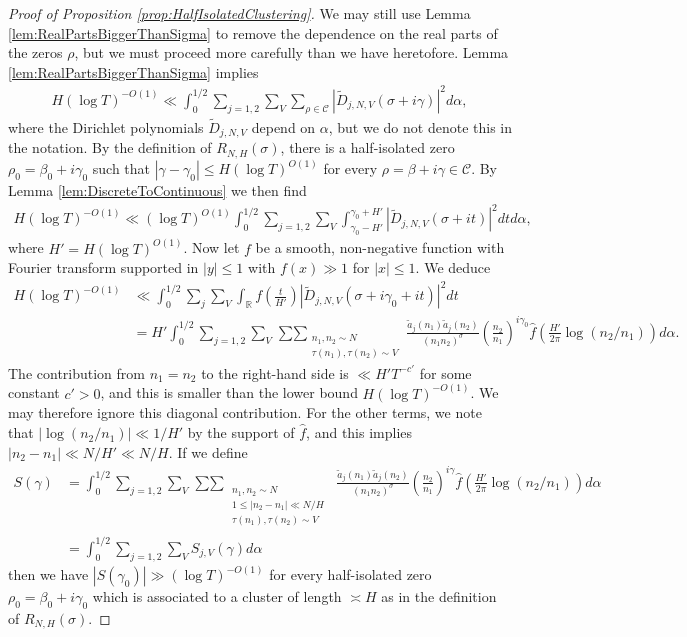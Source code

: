 \documentclass[12pt]{amsart}
\theoremstyle{plain}
\theoremstyle{definition}
\theoremstyle{remark}
\begin{document}
\begin{proof}[Proof of Proposition \ref{prop:HalfIsolatedClustering}]
We may still use Lemma \ref{lem:RealPartsBiggerThanSigma} to remove the dependence on the real parts of the zeros $\rho$, but we must proceed more carefully than we have heretofore. Lemma \ref{lem:RealPartsBiggerThanSigma} implies
\begin{align*}
H(\log T)^{-O(1)} \ll \int_0^{1/2}\sum_{j=1,2}\sum_V\sum_{\rho \in \mathcal{C}} |\tilde{D}_{j,N,V}(\sigma+i\gamma)|^2 d\alpha,
\end{align*}
where the Dirichlet polynomials $\tilde{D}_{j,N,V}$ depend on $\alpha$, but we do not denote this in the notation. By the definition of $R_{N,H}(\sigma)$, there is a half-isolated zero $\rho_0 = \beta_0 + i\gamma_0$ such that $|\gamma-\gamma_0| \leq H(\log T)^{O(1)}$ for every $\rho = \beta+i\gamma \in \mathcal{C}$. By Lemma \ref{lem:DiscreteToContinuous} we then find
\begin{align*}
H(\log T)^{-O(1)} \ll (\log T)^{O(1)}\int_0^{1/2}\sum_{j=1,2}\sum_V \int_{\gamma_0-H'}^{\gamma_0+H'} |\tilde{D}_{j,N,V}(\sigma+it)|^2 dt d\alpha,
\end{align*}
where $H' = H(\log T)^{O(1)}$. Now let $f$ be a smooth, non-negative function with Fourier transform supported in $|y| \leq 1$ with $f(x) \gg 1$ for $|x| \leq 1$. We deduce
\begin{align*}
H(\log T)^{-O(1)} &\ll\int_0^{1/2}\sum_j\sum_V \int_\mathbb{R} f\left(\frac{t}{H'}\right)|\tilde{D}_{j,N,V}(\sigma+i\gamma_0 + it)|^2 dt \\
&= H'\int_0^{1/2}\sum_{j=1,2}\sum_V\mathop{\sum\sum}_{\substack{n_1,n_2 \sim N \\ \tau(n_1),\tau(n_2) \sim V}} \frac{\tilde{a}_j(n_1)\tilde{a}_j(n_2)}{(n_1n_2)^\sigma}\left(\frac{n_2}{n_1}\right)^{i\gamma_0} \widehat{f}\left(\frac{H'}{2\pi}\log(n_2/n_1)\right)d\alpha.
\end{align*}
The contribution from $n_1=n_2$ to the right-hand side is $\ll H' T^{-c'}$ for some constant $c'>0$, and this is smaller than the lower bound $H(\log T)^{-O(1)}$. We may therefore ignore this diagonal contribution. For the other terms, we note that $|\log(n_2/n_1)| \ll 1/H'$ by the support of $\widehat{f}$, and this implies $|n_2-n_1| \ll N/H' \ll N/H$. If we define
\begin{align*}
S(\gamma) &= \int_0^{1/2}\sum_{j=1,2}\sum_V\mathop{\sum\sum}_{\substack{\substack{n_1,n_2 \sim N\\ 1\leq |n_2-n_1| \ll N/H \\ \tau(n_1),\tau(n_2) \sim V}}} \frac{\tilde{a}_j(n_1)\tilde{a}_j(n_2)}{(n_1n_2)^\sigma}\left(\frac{n_2}{n_1}\right)^{i\gamma} \widehat{f}\left(\frac{H'}{2\pi}\log(n_2/n_1)\right) d\alpha\\ 
&= \int_0^{1/2}\sum_{j=1,2}\sum_V S_{j,V}(\gamma)d\alpha
\end{align*}
then we have $|S(\gamma_0)| \gg (\log T)^{-O(1)}$ for every half-isolated zero $\rho_0 = \beta_0 + i\gamma_0$ which is associated to a cluster of length $\asymp H$ as in the definition of $R_{N,H}(\sigma)$.


\end{proof}
\end{document}
